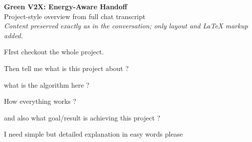 \documentclass[11pt,a4paper]{article}
\begin{document}
\begin{center}
{\LARGE\bfseries\color{accent} Green V2X: Energy-Aware Handoff}\\[0.35em]
{\large Project-style overview from full chat transcript}\\[0.5em]
{\small\textit{Content preserved exactly as in the conversation; only layout and \LaTeX{} markup added.}}
\end{center}
\vspace{1em}

\begin{usermsg}
FIrst checkout the whole project.

Then tell me what is this project about ?

what is the algorithm here ?

How everything works ?

and also what goal/result is achieving this project ?

I need simple but detailed explanation in easy words please
\end{usermsg}
\end{document}
